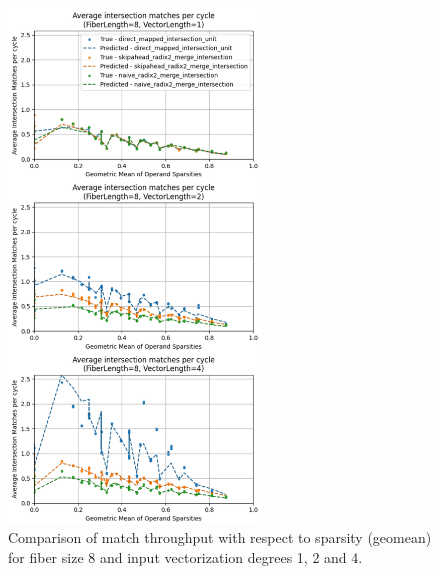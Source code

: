 \begin{figure}[H]
    \centering
    \includegraphics[width=0.6\textwidth]{figures/isect_model_fl8_vl1.pdf}
    \caption{Comparison of match throughput with respect to sparsity (geomean) for fiber size 8 and input vectorization degrees 1, 2 and 4.}
    \label{fig:isect_model_fl8_vl1}
\end{figure}

\clearpage

